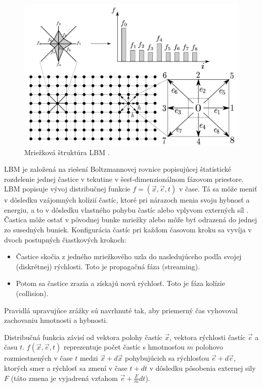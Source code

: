 \documentclass[]{tukediphc}
\begin{document}
\begin{figure}[!ht]
	\centering
	\includegraphics[width=.8\textwidth,angle=0]{figures/lbm-grid.jpg}
	\caption{Mriežková štruktúra LBM \citep{Soga2020}.}
\end{figure}

LBM je založená na riešení Boltzmannovej rovnice popisujúcej štatistické rozdelenie jednej častice v tekutine v šesť-dimenzionálnom fázovom priestore. LBM popisuje vývoj distribučnej funkcie $f = (\vec{x}, \vec{e}, t)$ v čase. Tá sa môže meniť v dôsledku vzájomných kolízií častíc, ktoré pri nárazoch menia svoju hybnosť a energiu, a to v dôsledku vlastného pohybu častíc alebo vplyvom externých síl \citep{HEIDLER2011thesis}. Častica môže ostať v pôvodnej bunke mriežky alebo môže byť odrazená do jednej zo susedných buniek. Konfigurácia častíc pri každom časovom kroku sa vyvíja v dvoch postupných čiastkových krokoch:

\begin{itemize}
	\item Častice skočia z jedného mriežkového uzla do nasledujúceho podľa svojej (diskrétnej) rýchlosti. Toto je propagačná fáza (streaming).
	\item Potom sa častice zrazia a získajú novú rýchlosť. Toto je fáza kolízie (collision).
\end{itemize}

Pravidlá upravujúce zrážky sú navrhnuté tak, aby priemerný čas vyhovoval zachovaniu hmotnosti a hybnosti.

Distribučná funkcia závisí od vektora polohy častíc $\vec{x}$, vektora rýchlosti častíc $\vec{e}$ a času $t$. $f(\vec{x}, \vec{e}, t)$ reprezentuje počet častíc s hmotnosťou $m$ polohovo rozmiestnených v čase $t$ medzi $\vec{x} + d\vec{x}$ pohybujúcich sa rýchlosťou $\vec{e} + d\vec{e}$, ktorých smer a rýchlosť sa zmení v čase $t + dt$ v dôsledku pôsobenia externej sily $F$ (táto zmena je vyjadrená vzťahom $\vec{e} + \frac{F}{m}dt$).
\end{document}
